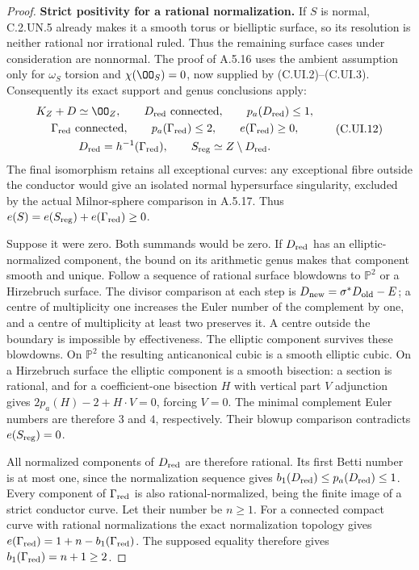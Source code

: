 \begin{proof}
\par\medskip\noindent\textbf{Strict positivity for a rational normalization.}\quad
If $S$ is normal, C.2.UN.5 already makes it a
smooth torus or bielliptic surface, so its
resolution is neither rational nor irrational
ruled. Thus the remaining surface cases under
consideration are nonnormal.
The proof of A.5.16 uses the ambient assumption
only for $\omega_S$ torsion and $\chi(\OO_S)=0$,
now supplied by (C.UI.2)--(C.UI.3). Consequently
its exact support and genus conclusions apply:
\[
 \begin{gathered}
 K_Z+D\simeq\OO_Z,\qquad D_{\rm red}\text{ connected},
 \qquad p_a(D_{\rm red})\le1,\\
 \Gamma_{\rm red}\text{ connected},\qquad
 p_a(\Gamma_{\rm red})\le2,\qquad
 e(\Gamma_{\rm red})\ge0,\\
 D_{\rm red}=h^{-1}(\Gamma_{\rm red}),\qquad
 S_{\rm reg}\simeq Z\setminus D_{\rm red}.
 \end{gathered}
 \tag{C.UI.12}
\]
The final isomorphism retains all exceptional curves:
any exceptional fibre outside the conductor would
give an isolated normal hypersurface singularity,
excluded by the actual Milnor-sphere comparison
in A.5.17. Thus
$e(S)=e(S_{\rm reg})+e(\Gamma_{\rm red})\ge0$.

Suppose it were zero. Both summands would be zero.
If $D_{\rm red}$ has an elliptic-normalized component,
the bound on its arithmetic genus makes that component
smooth and unique. Follow a sequence of rational
surface blowdowns to $\mathbb P^2$ or a Hirzebruch
surface. The divisor comparison at each step is
$D_{\rm new}=\sigma^*D_{\rm old}-E$; a centre of
multiplicity one increases the Euler number of the
complement by one, and a centre of multiplicity at
least two preserves it. A centre outside the
boundary is impossible by effectiveness. The
elliptic component survives these blowdowns.
On $\mathbb P^2$ the resulting anticanonical cubic
is a smooth elliptic cubic. On a Hirzebruch
surface the elliptic component is a smooth
bisection: a section is rational, and for a
coefficient-one bisection $H$ with vertical part
$V$ adjunction gives
$2p_a(H)-2+H\cdot V=0$, forcing $V=0$.
The minimal complement Euler numbers are therefore
$3$ and $4$, respectively. Their blowup comparison
contradicts $e(S_{\rm reg})=0$.

All normalized components of $D_{\rm red}$ are
therefore rational. Its first Betti number is at
most one, since the normalization sequence gives
$b_1(D_{\rm red})\le p_a(D_{\rm red})\le1$.
Every component of $\Gamma_{\rm red}$ is also
rational-normalized, being the finite image of a
strict conductor curve. Let their number be
$n\ge1$. For a connected compact curve with
rational normalizations the exact normalization
topology gives
$e(\Gamma_{\rm red})=1+n-b_1(\Gamma_{\rm red})$.
The supposed equality therefore gives
$b_1(\Gamma_{\rm red})=n+1\ge2$.


\end{proof}
